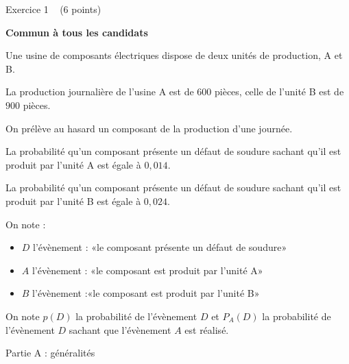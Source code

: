 
%
\begin{h2}Exercice 1   (6 points)\end{h2}
\textbf{Commun à tous les candidats}
\par
Une usine de composants électriques dispose de deux unités de production, A et B.
\par
La production journalière de l'usine A est de $600$ pièces, celle de l'unité B est de $900$ pièces.
\par
On prélève au hasard un composant de la production d'une journée.
\par
La probabilité qu'un composant présente un défaut de soudure sachant qu'il est produit par l'unité A est égale à $0,014$.
\par
La probabilité qu'un composant présente un défaut de soudure sachant qu'il est produit par l'unité B est égale à $0,024$.
\par
On note :
\begin{itemize}
     \item
     $D$ l'évènement : «le composant présente un défaut de soudure»
     \item
     $A$ l'évènement : «le composant est produit par l'unité A»
     \item
     $B$ l'évènement :«le composant est produit par l'unité B»
\end{itemize}
On note $p\left(D\right)$ la probabilité de l'évènement $D$ et $P_{A}\left(D\right)$ la probabilité de l'évènement $D$ sachant que l'évènement $A$ est réalisé.
\begin{h3}Partie A : généralités\end{h3}
